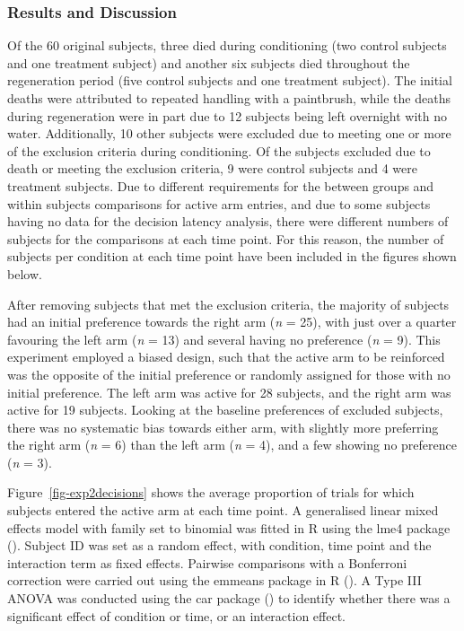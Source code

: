 \documentclass[
  jou,
  floatsintext,
  longtable,
  nolmodern,
  notxfonts,
  notimes,
  donotrepeattitle,
  colorlinks=true,linkcolor=blue,citecolor=blue,urlcolor=blue]{apa7}
\begin{document}
\subsubsection{Results and Discussion}\label{results-and-discussion-1}

Of the 60 original subjects, three died during conditioning (two control
subjects and one treatment subject) and another six subjects died
throughout the regeneration period (five control subjects and one
treatment subject). The initial deaths were attributed to repeated
handling with a paintbrush, while the deaths during regeneration were in
part due to 12 subjects being left overnight with no water.
Additionally, 10 other subjects were excluded due to meeting one or more
of the exclusion criteria during conditioning. Of the subjects excluded
due to death or meeting the exclusion criteria, 9 were control subjects
and 4 were treatment subjects. Due to different requirements for the
between groups and within subjects comparisons for active arm entries,
and due to some subjects having no data for the decision latency
analysis, there were different numbers of subjects for the comparisons
at each time point. For this reason, the number of subjects per
condition at each time point have been included in the figures shown
below.

After removing subjects that met the exclusion criteria, the majority of
subjects had an initial preference towards the right arm (\emph{n} =
25), with just over a quarter favouring the left arm (\emph{n} = 13) and
several having no preference (\emph{n} = 9). This experiment employed a
biased design, such that the active arm to be reinforced was the
opposite of the initial preference or randomly assigned for those with
no initial preference. The left arm was active for 28 subjects, and the
right arm was active for 19 subjects. Looking at the baseline
preferences of excluded subjects, there was no systematic bias towards
either arm, with slightly more preferring the right arm (\emph{n} = 6)
than the left arm (\emph{n} = 4), and a few showing no preference
(\emph{n} = 3).

Figure~\ref{fig-exp2decisions} shows the average proportion of trials
for which subjects entered the active arm at each time point. A
generalised linear mixed effects model with family set to binomial was
fitted in R using the lme4 package
(). Subject ID was
set as a random effect, with condition, time point and the interaction
term as fixed effects. Pairwise comparisons with a Bonferroni correction
were carried out using the emmeans package in R
(). A Type III ANOVA was
conducted using the car package () to identify whether there was a significant effect of
condition or time, or an interaction effect.
\end{document}
